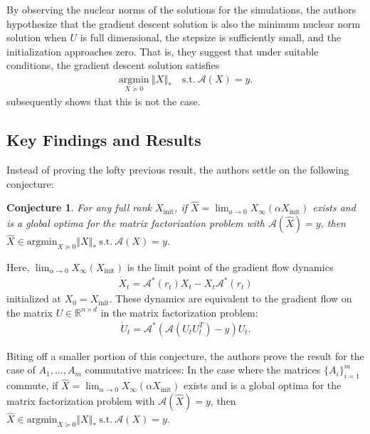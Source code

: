 \documentclass{article}
\newenvironment{manualtheorem}[1]{%
  \renewcommand\themanualtheoreminner{#1}%
  \manualtheoreminner
}{\endmanualtheoreminner}
\newtheorem*{conjecture}{Conjecture}
\begin{document}
By observing the nuclear norms of the solutions for the simulations, the authors hypothesize that the gradient descent solution is also the minimum nuclear norm solution when $U$ is full dimensional, the stepsize is sufficiently small, and the initialization approaches zero. That is, they suggest that under suitable conditions, the gradient descent solution satisfies
\begin{align*}
    \underset{X \succeq 0}{\text{argmin}} \ \left\Vert X \right\Vert_* \quad \text{s.t.} \ \mathcal{A}(X) = y.
\end{align*}
\cite{arora2019implicit} subsequently shows that this is not the case.

\subsection{Key Findings and Results}
Instead of proving the lofty previous result, the authors settle on the following conjecture:
\begin{conjecture}
For any full rank $X_{\text{init}}$, if $\widehat{X} = \lim_{a \rightarrow 0} X_{\infty}(\alpha X_{\text{init}})$ exists and is a global optima for the matrix factorization problem with $\mathcal{A}(\widehat{X}) = y$, then $\widehat{X} \in \text{argmin}_{X \succeq 0} \left \Vert X \right \Vert_* \ \text{s.t.} \ \mathcal{A}(X) = y$. 
\end{conjecture}
Here, $\lim_{\alpha \rightarrow 0} X_{\infty}(X_{\text{init}})$ is the limit point of the gradient flow dynamics
\begin{align*}
    \dot{X}_t = \mathcal{A}^*(r_t)X_t - X_t\mathcal{A}^*(r_t)
\end{align*}
initialized at $X_0 = X_{\text{init}}$. These dynamics are equivalent to the gradient flow on the matrix $U \in \mathbb{R}^{n \times d}$ in the matrix factorization problem:
\begin{align*}
    \dot{U}_t = \mathcal{A}^*(\mathcal{A}(U_t U_t^T) - y)U_t.
\end{align*}

Biting off a smaller portion of this conjecture, the authors prove the result for the case of $A_1, \ldots, A_m$ commutative matrices:
\begin{manualtheorem}{1}\label{gunasekharthm1}
In the case where the matrices $\{A_i\}_{i=1}^m$ commute, if $\widehat{X} = \lim_{\alpha \rightarrow 0} X_{\infty}(\alpha X_{\text{init}})$ exists and is a global optima for the matrix factorization problem with $\mathcal{A}(\widehat{X}) = y$, then $\widehat{X} \in \text{argmin}_{X \succeq 0} \left \Vert X \right \Vert_* \ \text{s.t.} \ \mathcal{A}(X) = y$.
\end{manualtheorem}
\end{document}
